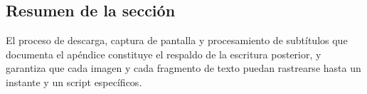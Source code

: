 \subsection{Resumen de la sección}
El proceso de descarga, captura de pantalla y procesamiento de subtítulos que documenta el apéndice constituye el respaldo de la escritura posterior, y garantiza que cada imagen y cada fragmento de texto puedan rastrearse hasta un instante y un script específicos.
